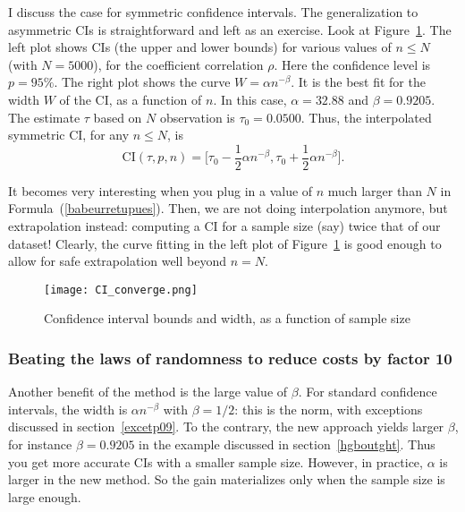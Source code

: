 \documentclass[oneside,10pt]{book}
\begin{document}
I discuss the case for symmetric confidence intervals. The generalization to asymmetric CIs is straightforward and left as an exercise. 
Look at Figure~\ref{fig:nogrdf2abcgt43}. The left plot shows CIs (the upper and lower bounds) for various values of $n\leq N$
 (with $N = 5000$), for the
 coefficient correlation $\rho$. Here the confidence level is $p=95\%$. 
The right plot shows the curve $W = \alpha n^{-\beta}$. It is the best fit 
 for the width $W$ of the CI, as a function of $n$. In this case, $\alpha = 32.88$ and $\beta = 0.9205$. The estimate
 $\tau$ based on $N$ observation is $\tau_0 = 0.0500$. Thus, the interpolated symmetric CI, for any $n\leq N$, is
\begin{equation}
 \text{CI}(\tau, p, n) = \Big[\tau_0 - \frac{1}{2}\alpha n^{-\beta}, \tau_0 + \frac{1}{2}\alpha n^{-\beta}\Big].\label{babeurretupues}
\end{equation}

It becomes very interesting when you plug in a value of $n$ much larger than $N$ in Formula~(\ref{babeurretupues}). Then,
 we are not doing interpolation anymore, but extrapolation instead: computing a CI for a sample size (say) twice that of our dataset!
 Clearly, the curve fitting in the left plot of Figure~\ref{fig:nogrdf2abcgt43} is good enough to allow for safe extrapolation
 well beyond $n = N$.


\begin{figure}[H]
\centering
\texttt{[image: CI\_converge.png]} %
\caption{Confidence interval bounds and width, as a function of sample size}
\label{fig:nogrdf2abcgt43}
\end{figure}


\subsubsection{Beating the laws of randomness to reduce costs by factor 10} 

Another benefit of the method is the large value of $\beta$. For standard confidence intervals, the width is $\alpha n^{-\beta}$
 with $\beta = 1/2$: this is the norm, with exceptions discussed in section~\ref{excetp09}. To the contrary, the new approach yields
 larger $\beta$, for instance $\beta = 0.9205$ in the example discussed in section~\ref{hgboutght}. Thus you get more accurate
 CIs with a smaller sample size. However, in practice, $\alpha$ is larger in the new method. So the gain materializes only when the sample size is large enough.
\end{document}
